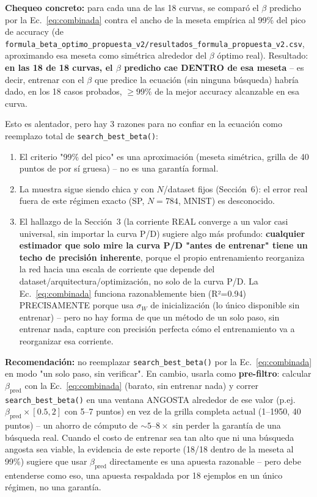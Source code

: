 \documentclass[11pt]{article}
\begin{document}
\textbf{Chequeo concreto:} para cada una de las 18 curvas, se comparó el
$\beta$ predicho por la Ec.~\ref{eq:combinada} contra el ancho de la
meseta empírica al 99\% del pico de accuracy (de
\texttt{formula\_beta\_optimo\_propuesta\_v2/resultados\_formula\_propuesta\_v2.csv},
aproximando esa meseta como simétrica alrededor del $\beta$ óptimo real).
Resultado: \textbf{en las 18 de 18 curvas, el $\beta$ predicho cae DENTRO
de esa meseta} -- es decir, entrenar con el $\beta$ que predice la
ecuación (sin ninguna búsqueda) habría dado, en los 18 casos probados,
$\geq99\%$ de la mejor accuracy alcanzable en esa curva.

Esto es alentador, pero hay 3 razones para no confiar en la ecuación como
reemplazo total de \texttt{search\_best\_beta()}:
\begin{enumerate}
\item El criterio "99\% del pico" es una aproximación (meseta simétrica,
  grilla de 40 puntos de por sí gruesa) -- no es una garantía formal.
\item La muestra sigue siendo chica y con $N$/dataset fijos (Sección~6):
  el error real fuera de este régimen exacto (SP, $N=784$, MNIST) es
  desconocido.
\item El hallazgo de la Sección~3 (la corriente REAL converge a un valor
  casi universal, sin importar la curva P/D) sugiere algo más profundo:
  \textbf{cualquier estimador que solo mire la curva P/D "antes de
  entrenar" tiene un techo de precisión inherente}, porque el propio
  entrenamiento reorganiza la red hacia una escala de corriente que
  depende del dataset/arquitectura/optimización, no solo de la curva P/D.
  La Ec.~\ref{eq:combinada} funciona razonablemente bien (R²=0.94) PRECISAMENTE
  porque usa $\sigma_W$ de inicialización (lo único disponible sin
  entrenar) -- pero no hay forma de que un método de un solo paso, sin
  entrenar nada, capture con precisión perfecta cómo el entrenamiento va a
  reorganizar esa corriente.
\end{enumerate}

\textbf{Recomendación:} no reemplazar \texttt{search\_best\_beta()} por la
Ec.~\ref{eq:combinada} en modo "un solo paso, sin verificar". En cambio,
usarla como \textbf{pre-filtro}: calcular $\beta_{\text{pred}}$ con la
Ec.~\ref{eq:combinada} (barato, sin entrenar nada) y correr
\texttt{search\_best\_beta()} en una ventana ANGOSTA alrededor de ese valor
(p.ej.\ $\beta_{\text{pred}}\times[0.5, 2]$ con 5--7 puntos) en vez de la
grilla completa actual (1--1950, 40 puntos) -- un ahorro de cómputo de
$\sim5$--$8\times$ sin perder la garantía de una búsqueda real. Cuando el
costo de entrenar sea tan alto que ni una búsqueda angosta sea viable, la
evidencia de este reporte (18/18 dentro de la meseta al 99\%) sugiere que
usar $\beta_{\text{pred}}$ directamente es una apuesta razonable -- pero
debe entenderse como eso, una apuesta respaldada por 18 ejemplos en un
único régimen, no una garantía.
\end{document}
